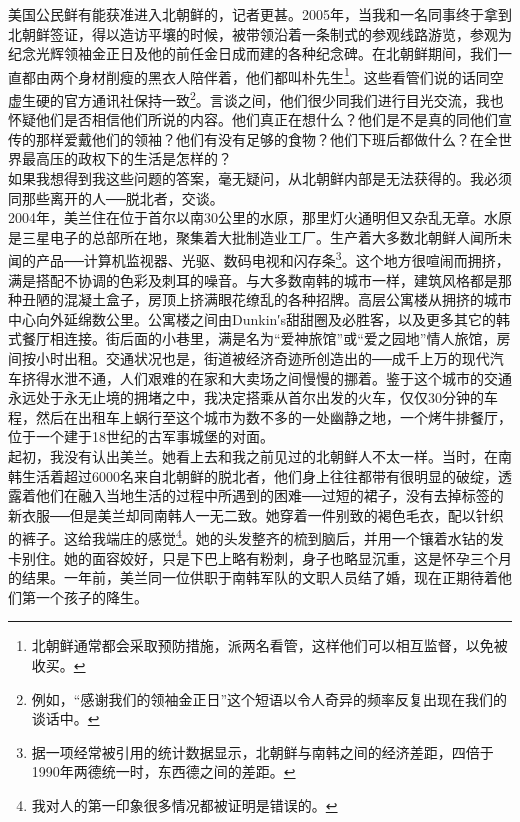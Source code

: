 美国公民鲜有能获准进入北朝鲜的，记者更甚。2005年，当我和一名同事终于拿到北朝鲜签证，得以造访平壤的时候，被带领沿着一条制式的参观线路游览，参观为纪念光辉领袖金正日及他的前任金日成而建的各种纪念碑。在北朝鲜期间，我们一直都由两个身材削瘦的黑衣人陪伴着，他们都叫朴先生\footnote{北朝鲜通常都会采取预防措施，派两名看管，这样他们可以相互监督，以免被收买。}。这些看管们说的话同空虚生硬的官方通讯社保持一致\footnote{例如，“感谢我们的领袖金正日”这个短语以令人奇异的频率反复出现在我们的谈话中。}。言谈之间，他们很少同我们进行目光交流，我也怀疑他们是否相信他们所说的内容。他们真正在想什么？他们是不是真的同他们宣传的那样爱戴他们的领袖？他们有没有足够的食物？他们下班后都做什么？在全世界最高压的政权下的生活是怎样的？\\

如果我想得到我这些问题的答案，毫无疑问，从北朝鲜内部是无法获得的。我必须同那些离开的人──脱北者，交谈。\\

2004年，美兰住在位于首尔以南30公里的水原，那里灯火通明但又杂乱无章。水原是三星电子的总部所在地，聚集着大批制造业工厂。生产着大多数北朝鲜人闻所未闻的产品──计算机监视器、光驱、数码电视和闪存条\footnote{据一项经常被引用的统计数据显示，北朝鲜与南韩之间的经济差距，四倍于1990年两德统一时，东西德之间的差距。}。这个地方很喧闹而拥挤，满是搭配不协调的色彩及刺耳的噪音。与大多数南韩的城市一样，建筑风格都是那种丑陋的混凝土盒子，房顶上挤满眼花缭乱的各种招牌。高层公寓楼从拥挤的城市中心向外延绵数公里。公寓楼之间由Dunkin′s甜甜圈及必胜客，以及更多其它的韩式餐厅相连接。街后面的小巷里，满是名为“爱神旅馆”或“爱之园地”情人旅馆，房间按小时出租。交通状况也是，街道被经济奇迹所创造出的──成千上万的现代汽车挤得水泄不通，人们艰难的在家和大卖场之间慢慢的挪着。鉴于这个城市的交通永远处于永无止境的拥堵之中，我决定搭乘从首尔出发的火车，仅仅30分钟的车程，然后在出租车上蜗行至这个城市为数不多的一处幽静之地，一个烤牛排餐厅，位于一个建于18世纪的古军事城堡的对面。\\

起初，我没有认出美兰。她看上去和我之前见过的北朝鲜人不太一样。当时，在南韩生活着超过6000名来自北朝鲜的脱北者，他们身上往往都带有很明显的破绽，透露着他们在融入当地生活的过程中所遇到的困难──过短的裙子，没有去掉标签的新衣服──但是美兰却同南韩人一无二致。她穿着一件别致的褐色毛衣，配以针织的裤子。这给我端庄的感觉\footnote{我对人的第一印象很多情况都被证明是错误的。}。她的头发整齐的梳到脑后，并用一个镶着水钻的发卡别住。她的面容姣好，只是下巴上略有粉刺，身子也略显沉重，这是怀孕三个月的结果。一年前，美兰同一位供职于南韩军队的文职人员结了婚，现在正期待着他们第一个孩子的降生。\\

